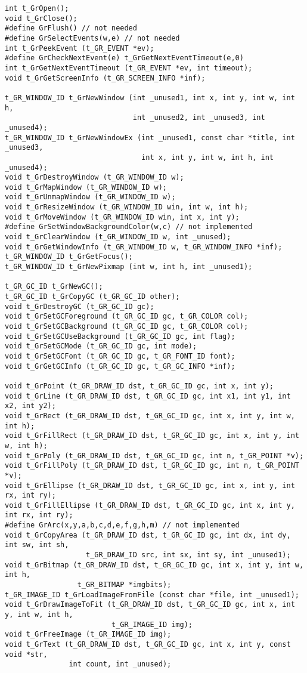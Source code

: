 \documentclass[12pt,letterpaper]{report}
\begin{document}
{\footnotesize\begin{verbatim}
int t_GrOpen();
void t_GrClose();
#define GrFlush() // not needed
#define GrSelectEvents(w,e) // not needed
int t_GrPeekEvent (t_GR_EVENT *ev);
#define GrCheckNextEvent(e) t_GrGetNextEventTimeout(e,0)
int t_GrGetNextEventTimeout (t_GR_EVENT *ev, int timeout);
void t_GrGetScreenInfo (t_GR_SCREEN_INFO *inf);

t_GR_WINDOW_ID t_GrNewWindow (int _unused1, int x, int y, int w, int h,
                              int _unused2, int _unused3, int _unused4);
t_GR_WINDOW_ID t_GrNewWindowEx (int _unused1, const char *title, int _unused3,
                                int x, int y, int w, int h, int _unused4);
void t_GrDestroyWindow (t_GR_WINDOW_ID w);
void t_GrMapWindow (t_GR_WINDOW_ID w);
void t_GrUnmapWindow (t_GR_WINDOW_ID w);
void t_GrResizeWindow (t_GR_WINDOW_ID win, int w, int h);
void t_GrMoveWindow (t_GR_WINDOW_ID win, int x, int y);
#define GrSetWindowBackgroundColor(w,c) // not implemented
void t_GrClearWindow (t_GR_WINDOW_ID w, int _unused);
void t_GrGetWindowInfo (t_GR_WINDOW_ID w, t_GR_WINDOW_INFO *inf);
t_GR_WINDOW_ID t_GrGetFocus();
t_GR_WINDOW_ID t_GrNewPixmap (int w, int h, int _unused1);

t_GR_GC_ID t_GrNewGC();
t_GR_GC_ID t_GrCopyGC (t_GR_GC_ID other);
void t_GrDestroyGC (t_GR_GC_ID gc);
void t_GrSetGCForeground (t_GR_GC_ID gc, t_GR_COLOR col);
void t_GrSetGCBackground (t_GR_GC_ID gc, t_GR_COLOR col);
void t_GrSetGCUseBackground (t_GR_GC_ID gc, int flag);
void t_GrSetGCMode (t_GR_GC_ID gc, int mode);
void t_GrSetGCFont (t_GR_GC_ID gc, t_GR_FONT_ID font);
void t_GrGetGCInfo (t_GR_GC_ID gc, t_GR_GC_INFO *inf);

void t_GrPoint (t_GR_DRAW_ID dst, t_GR_GC_ID gc, int x, int y);
void t_GrLine (t_GR_DRAW_ID dst, t_GR_GC_ID gc, int x1, int y1, int x2, int y2);
void t_GrRect (t_GR_DRAW_ID dst, t_GR_GC_ID gc, int x, int y, int w, int h);
void t_GrFillRect (t_GR_DRAW_ID dst, t_GR_GC_ID gc, int x, int y, int w, int h);
void t_GrPoly (t_GR_DRAW_ID dst, t_GR_GC_ID gc, int n, t_GR_POINT *v);
void t_GrFillPoly (t_GR_DRAW_ID dst, t_GR_GC_ID gc, int n, t_GR_POINT *v);
void t_GrEllipse (t_GR_DRAW_ID dst, t_GR_GC_ID gc, int x, int y, int rx, int ry);
void t_GrFillEllipse (t_GR_DRAW_ID dst, t_GR_GC_ID gc, int x, int y, int rx, int ry);
#define GrArc(x,y,a,b,c,d,e,f,g,h,m) // not implemented
void t_GrCopyArea (t_GR_DRAW_ID dst, t_GR_GC_ID gc, int dx, int dy, int sw, int sh,
                   t_GR_DRAW_ID src, int sx, int sy, int _unused1);
void t_GrBitmap (t_GR_DRAW_ID dst, t_GR_GC_ID gc, int x, int y, int w, int h,
                 t_GR_BITMAP *imgbits);
t_GR_IMAGE_ID t_GrLoadImageFromFile (const char *file, int _unused1);
void t_GrDrawImageToFit (t_GR_DRAW_ID dst, t_GR_GC_ID gc, int x, int y, int w, int h,
                         t_GR_IMAGE_ID img);
void t_GrFreeImage (t_GR_IMAGE_ID img);
void t_GrText (t_GR_DRAW_ID dst, t_GR_GC_ID gc, int x, int y, const void *str,
               int count, int _unused);


\end{verbatim}}
\end{document}
